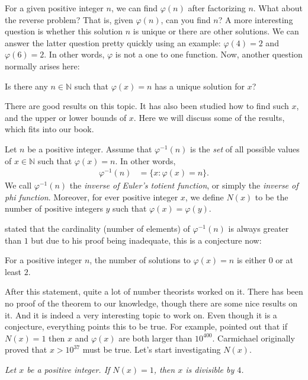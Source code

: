 \documentclass[main.tex]{subfile}
\begin{document}
	For a given positive integer $n$, we can find $\varphi(n)$ after factorizing $n$. What about the reverse problem? That is, given $\varphi(n)$, can you find $n$? A more interesting question is whether this solution $n$ is unique or there are other solutions. We can answer the latter question pretty quickly using an example: $\varphi(4)=2$ and $\varphi (6)=2$. In other words, $\varphi $ is not a one to one function. Now, another question normally arises here:
		\begin{problem}
			Is there any $n\in\mathbb{N}$ such that $\varphi(x)=n$ has a unique solution for $x$?
		\end{problem}
	There are good results on this topic. It has also been studied how to find such $x$, and the upper or lower bounds of $x$. Here we will discuss some of the results, which fits into our book.
		\begin{definition}
			Let $n$ be a positive integer. Assume that $\varphi ^{-1}(n)$ is the \textit{set} of all possible values of $x\in\mathbb{N} $ such that $\varphi (x)=n$. In other words,
				\begin{align*}
					\varphi^{-1}(n) & = \{x:\varphi(x)=n\}.
				\end{align*}
			We call $\varphi^{-1}(n)$ the \textit{inverse of Euler's totient function}, or simply the \textit{inverse of phi function}. Moreover, for ever positive integer $x$, we define $N(x)$ to be the number of positive integers $y$ such that $\varphi(x)=\varphi(y)$.
		\end{definition}

	\textcite{carmichael_1907} stated that the cardinality (number of elements) of $\varphi^{-1}(n)$ is always greater than $1$ but due to his proof being inadequate, this is a conjecture now:
		\begin{conjecture}
			For a positive integer $n$, the number of solutions to $\varphi(x)=n$ is either $0$ or at least $2$.
		\end{conjecture}
	After this statement, quite a lot of number theorists worked on it. There has been no proof of the theorem to our knowledge, though there are some nice results on it. And it is indeed a very interesting topic to work on. Even though it is a conjecture, everything points this to be true. For example, \textcite{jr._1947} pointed out that if $N(x)=1$ then $x$ and $\varphi(x)$ are both larger than $10^{400}$. Carmichael originally proved that $x>10^{37}$ must be true. Let's start investigating $N(x)$.
		\begin{theorem}\slshape
			Let $x$ be a positive integer. If $N(x)=1$, then $x$ is divisible by $4$.
		\end{theorem}
\end{document}
